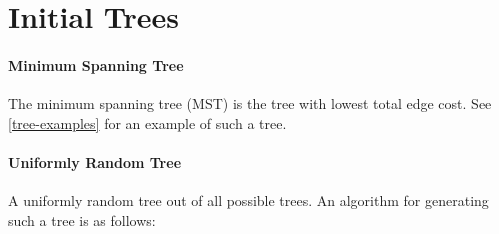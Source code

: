 \documentclass[a4paper, oneside]{discothesis}
\begin{document}
%


\newpage
\section{Initial Trees}
\label{initial-trees}

\paragraph{Minimum Spanning Tree}\label{tree:mst}

The minimum spanning tree (MST) is the tree with lowest total edge cost. See \autoref{tree-examples} for an example of such a tree.

\paragraph{Uniformly Random Tree}\label{tree:random}

A uniformly random tree out of all possible trees. An algorithm for generating such a tree is as follows:
\end{document}
